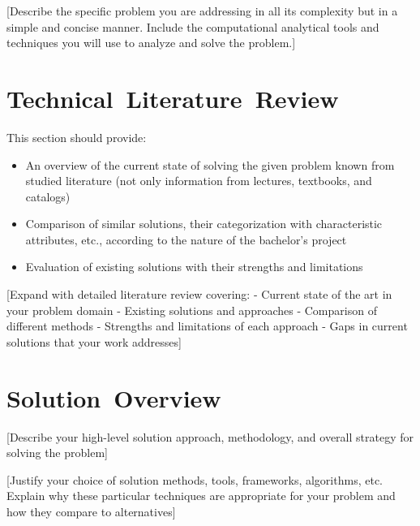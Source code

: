 \documentclass[11pt,a4paper,oneside]{book}
\begin{document}
[Describe the specific problem you are addressing in all its complexity but in a simple and concise manner. Include the computational analytical tools and techniques you will use to analyze and solve the problem.]

\section{Technical~Literature~Review}

This section should provide:
\begin{itemize}
    \item An overview of the current state of solving the given problem known from studied literature (not only information from lectures, textbooks, and catalogs)
    \item Comparison of similar solutions, their categorization with characteristic attributes, etc., according to the nature of the bachelor's project
    \item Evaluation of existing solutions with their strengths and limitations
\end{itemize}

[Expand with detailed literature review covering:
- Current state of the art in your problem domain
- Existing solutions and approaches
- Comparison of different methods
- Strengths and limitations of each approach
- Gaps in current solutions that your work addresses]

\section{Solution~Overview}

[Describe your high-level solution approach, methodology, and overall strategy for solving the problem]

[Justify your choice of solution methods, tools, frameworks, algorithms, etc. Explain why these particular techniques are appropriate for your problem and how they compare to alternatives]
\end{document}
